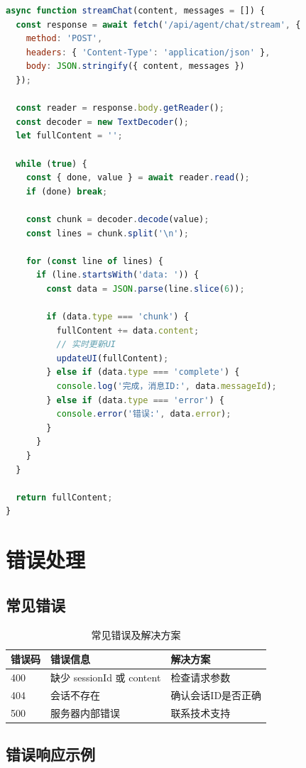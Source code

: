\documentclass[12pt,a4paper]{article}
\begin{document}
\begin{lstlisting}[language=javascript]
async function streamChat(content, messages = []) {
  const response = await fetch('/api/agent/chat/stream', {
    method: 'POST',
    headers: { 'Content-Type': 'application/json' },
    body: JSON.stringify({ content, messages })
  });

  const reader = response.body.getReader();
  const decoder = new TextDecoder();
  let fullContent = '';

  while (true) {
    const { done, value } = await reader.read();
    if (done) break;

    const chunk = decoder.decode(value);
    const lines = chunk.split('\n');

    for (const line of lines) {
      if (line.startsWith('data: ')) {
        const data = JSON.parse(line.slice(6));

        if (data.type === 'chunk') {
          fullContent += data.content;
          // 实时更新UI
          updateUI(fullContent);
        } else if (data.type === 'complete') {
          console.log('完成，消息ID:', data.messageId);
        } else if (data.type === 'error') {
          console.error('错误:', data.error);
        }
      }
    }
  }

  return fullContent;
}
\end{lstlisting}

\section{错误处理}

\subsection{常见错误}

\begin{table}[h]
  \centering
  \begin{tabular}{lll}
    \toprule
    错误码 & 错误信息 & 解决方案 \\
    \midrule
    400 & 缺少 sessionId 或 content & 检查请求参数 \\
    404 & 会话不存在 & 确认会话ID是否正确 \\
    500 & 服务器内部错误 & 联系技术支持 \\
    \bottomrule
  \end{tabular}
  \caption{常见错误及解决方案}
\end{table}

\subsection{错误响应示例}
\end{document}
